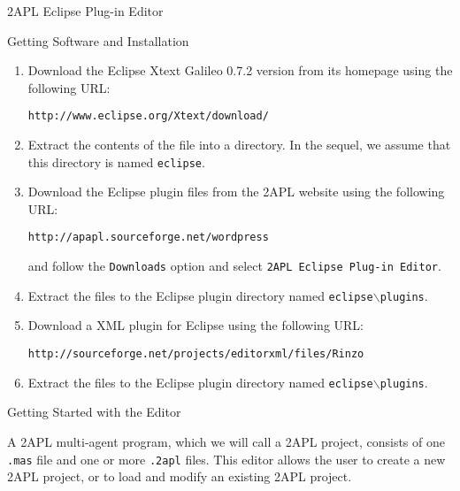 \begin{chapter}{2APL Eclipse Plug-in Editor}
\begin{section}{Getting Software and Installation}
\begin{enumerate}
    \item Download the Eclipse Xtext Galileo 0.7.2 version from its homepage using the following URL:
    \begin{center}
        {\tt http://www.eclipse.org/Xtext/download/}
    \end{center}

    \item Extract the contents of the file into a directory. In the sequel, we assume that this directory is named {\tt eclipse}.

    \item Download the Eclipse plug\-in files from the 2APL website using the following URL:
    \begin{center}
    {\tt http://apapl.sourceforge.net/wordpress}
    \end{center}
    and follow the {\tt Downloads} option and select {\tt 2APL Eclipse Plug-in Editor}.

    \item Extract the files to the Eclipse plug\-in directory named {\tt eclipse$\backslash$plugins}.

    \item Download a XML plug\-in for Eclipse using the following URL:
    \begin{center}
    {\tt http://sourceforge.net/projects/editorxml/files/Rinzo}
    \end{center}

    \item Extract the files to the Eclipse plug\-in directory named
    {\tt eclipse$\backslash$plugins}.
\end{enumerate}
\end{section}


\begin{section}{Getting Started with the Editor}

A 2APL multi-agent program, which we will call a 2APL project,
consists of one \texttt{.mas} file and one or more \texttt{.2apl}
files. This editor allows the user to create a new 2APL project, or
to load and modify an existing 2APL project.


\end{section}
\end{chapter}
